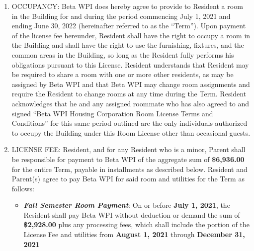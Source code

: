 \documentclass[legalpaper, 12pt]{article}
\begin{document}
\begin{enumerate} 

        \item OCCUPANCY\@:  Beta WPI does hereby agree to provide to Resident a
                room in the Building for and during the period commencing July
                1, 2021 and ending June 30, 2022 (hereinafter referred to as the
                “Term”). Upon payment of the license fee hereunder, Resident
                shall have the right to occupy a room in the Building and shall
                have the right to use the furnishing, fixtures, and the common
                areas in the Building, so long as the Resident fully performs
                his obligations pursuant to this License.  Resident understands
                that Resident may be required to share a room with one or more
                other residents, as may be assigned by Beta WPI and that Beta
                WPI may change room assignments and require the Resident to
                change rooms at any time during the Term. Resident acknowledges
                that he and any assigned roommate who has also agreed to and
                signed “Beta WPI Housing Corporation Room License Terms and
                Conditions” for this same period outlined are the only
                individuals authorized to occupy the Building under this Room
                License other than occasional guests.

        \item LICENSE FEE\@: Resident, and for any Resident who is a minor, Parent
                shall be responsible for payment to Beta WPI of the aggregate
                sum of \textbf{\$6,936.00} for the entire Term, payable in installments
                as described below. Resident and Parent(s) agree to pay Beta WPI
                for said room and utilities for the Term as follows:

                \begin{itemize} 
                                
                        \item \textbf{\textit{Fall Semester Room Payment}}: On
                                or before \textbf{July 1, 2021}, the Resident
                                shall pay Beta WPI without deduction or demand
                                the sum of \textbf{\$2,928.00} plus any
                                processing fees, which shall include the
                                portion of the License Fee and utilities from
                                \textbf{August 1, 2021} through
                                \textbf{December 31, 2021}


\end{itemize}
\end{enumerate}
\end{document}

